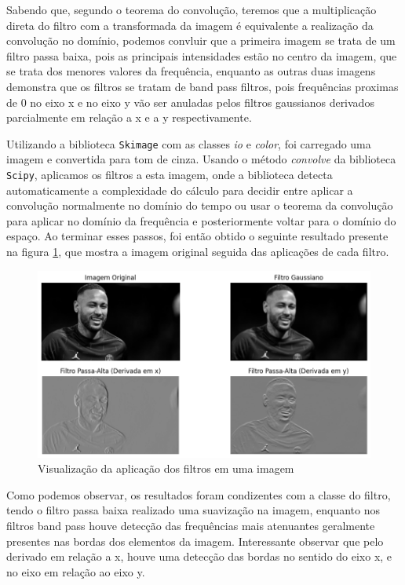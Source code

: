 \documentclass[a4paper, 11pt]{article}
\begin{document}
Sabendo que, segundo o teorema do convolução, teremos que a multiplicação direta do filtro com a transformada da imagem é equivalente a realização da convolução no domínio, podemos convluir que a primeira imagem se trata de um filtro passa baixa, pois as principais intensidades estão no centro da imagem, que se trata dos menores valores da frequência, enquanto as outras duas imagens demonstra que os filtros se tratam de band pass filtros, pois frequências proximas de 0 no eixo x e no eixo y vão ser anuladas pelos filtros gaussianos derivados parcialmente em relação a x e a y respectivamente.

Utilizando a biblioteca \texttt{Skimage} com as classes \textit{io} e \textit{color}, foi carregado uma imagem e convertida para tom de cinza. Usando o método \textit{convolve} da biblioteca \texttt{Scipy}, aplicamos os filtros a esta imagem, onde a biblioteca detecta automaticamente a complexidade do cálculo para decidir entre aplicar a convolução normalmente no domínio do tempo ou usar o teorema da convolução para aplicar no domínio da frequência e posteriormente voltar para o domínio do espaço. Ao terminar esses passos, foi então obtido o seguinte resultado presente na figura \ref{fig:ney}, que mostra a imagem original seguida das aplicações de cada filtro.

\begin{figure}[H]
    \centering 
    \includegraphics[width=1\textwidth]{imgs/ney.png}
    \caption{Visualização da aplicação dos filtros em uma imagem}
    \label{fig:ney} 
\end{figure}

Como podemos observar, os resultados foram condizentes com a classe do filtro, tendo o filtro passa baixa realizado uma suavização na imagem, enquanto nos filtros band pass houve detecção das frequências mais atenuantes geralmente presentes nas bordas dos elementos da imagem. Interessante observar que pelo derivado em relação a x, houve uma detecção das bordas no sentido do eixo x, e no eixo em relação ao eixo y.
\end{document}

